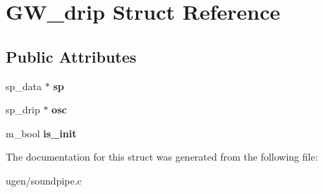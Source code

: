 \hypertarget{structGW__drip}{}\section{G\+W\+\_\+drip Struct Reference}
\label{structGW__drip}
\subsection*{Public Attributes}
\begin{DoxyCompactItemize}
\item 
\hypertarget{structGW__drip_aca6f510ded5b5c6a2856660819e76fdc}{}\label{structGW__drip_aca6f510ded5b5c6a2856660819e76fdc} 
sp\+\_\+data $\ast$ {\bfseries sp}
\item 
\hypertarget{structGW__drip_ab2491250dca2a7869222156064782fc4}{}\label{structGW__drip_ab2491250dca2a7869222156064782fc4} 
sp\+\_\+drip $\ast$ {\bfseries osc}
\item 
\hypertarget{structGW__drip_a58246d5d16c6cadc34477ed1db82f8b7}{}\label{structGW__drip_a58246d5d16c6cadc34477ed1db82f8b7} 
m\+\_\+bool {\bfseries is\+\_\+init}
\end{DoxyCompactItemize}


The documentation for this struct was generated from the following file\+:\begin{DoxyCompactItemize}
\item 
ugen/soundpipe.\+c\end{DoxyCompactItemize}
